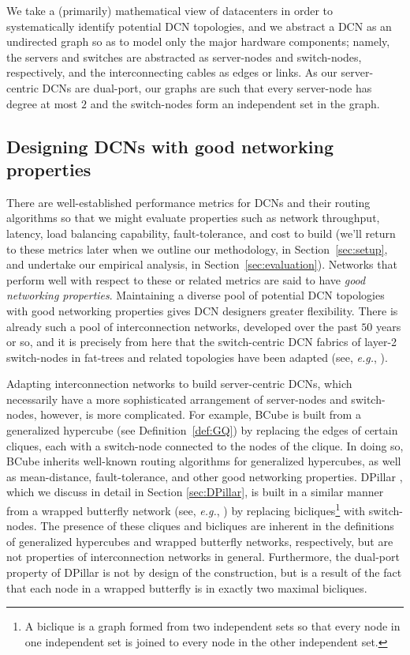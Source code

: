 \documentclass[]{amsart}
\begin{document}
We take a (primarily) mathematical view of datacenters in order to
systematically identify potential DCN topologies, and we abstract a DCN as an undirected graph so as to model only the major hardware components; namely, the servers and switches are abstracted as server-nodes and switch-nodes, respectively, and the interconnecting cables as edges or links. As our server-centric DCNs are dual-port, our graphs are such that every server-node has degree at most $2$ and the switch-nodes form an independent set in the graph. 

\subsection{Designing DCNs with good networking properties}
\label{sec:dcns-with-good-networking}

There are well-established performance metrics for DCNs and their routing
algorithms so that we might evaluate properties such as network throughput, latency, load balancing
capability, fault-tolerance, and cost to build (we'll return to these metrics later when we outline our methodology, in Section~\ref{sec:setup}, and undertake our empirical analysis, in Section~\ref{sec:evaluation}).  Networks
that perform well with respect to these or related metrics are said to
have \emph{good networking properties}.  Maintaining a diverse pool of
potential DCN topologies with good networking properties gives DCN
designers greater flexibility.  There is already such a pool of interconnection networks, developed over the past $50$ years or so, and it is precisely from here that the switch-centric DCN
fabrics of layer-2 switch-nodes in fat-trees and related topologies have been adapted
(see, \emph{e.g.}, \cite{Al-FaresLoukissasVahdat2008,Leiserson1985}).

Adapting interconnection networks to build server-centric DCNs, which necessarily have a more sophisticated arrangement of server-nodes and switch-nodes, however, is more complicated.
For example, BCube \cite{GuoLuLi2009} is built from a generalized
hypercube (see Definition~\ref{def:GQ}) by replacing the edges of
certain cliques, each with a switch-node connected to the nodes of
the clique.  In doing so, BCube inherits well-known routing algorithms
for generalized hypercubes, as well as mean-distance, fault-tolerance,
and other good networking properties.  DPillar \cite{LiaoYinYin2012}, which we discuss in
detail in Section \ref{sec:DPillar}, is built in a similar
manner from a wrapped butterfly network (see, \emph{e.g.}, \cite{Leighton1992}) by replacing bicliques\footnote{A biclique is a graph formed from two independent sets so that every node in one independent set is joined to every node in the other independent set.} with switch-nodes.  The presence
of these cliques and bicliques are inherent in the definitions of
generalized hypercubes and wrapped butterfly networks, respectively,
but are not properties of interconnection networks in
general. Furthermore, the dual-port property of DPillar is not by
design of the construction, but is a result of the fact that each node
in a wrapped butterfly is in exactly two maximal bicliques.
\end{document}

